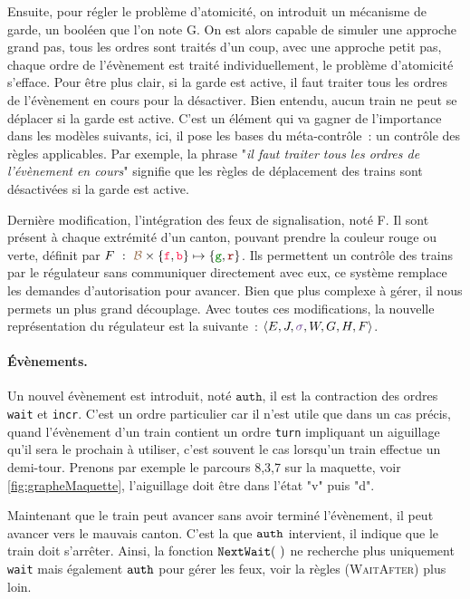 \documentclass[oneside, a4paper, 11pt]{book}
\newcommand{\ruleFmt}[1]{\textsc{(#1)}}
\newcommand{\ruleDef}[1]{\hypertarget{#1}{\ruleFmt{#1}}}
\newcommand{\forward}{\ensuremath{\mathtt{f}}}
\newcommand{\backward}{\ensuremath{\mathtt{b}}}
\newcommand{\dirFmt}[1]{{\color{dircolor} #1}}
\newcommand{\dirForward}{\ensuremath{\dirFmt{\forward}}}
\newcommand{\dirBackward}{\ensuremath{\dirFmt{\backward}}}
\newcommand{\posFmt}[1]{{\color{poscolor}{#1}}}
\newcommand{\authOrder}{{\mbox{\ensuremath{\mathtt{auth}}}}}
\newcommand{\swFmt}[1]{{\color{swcolor}{#1}}}
\newcommand{\sigred}{{\mbox{${\color{red!50!black}\mathtt{r}}$}}}
\newcommand{\siggreen}{{\mbox{${\color{green!50!black}\mathtt{g}}$}}}
\newcommand{\nextWait}[1]{\ensuremath{{\tt NextWait}(#1)}}
\newcommand{\regM}[7]{\langle #1, #2, #3, #4, #5, #6, #7 \rangle}
\begin{document}
Ensuite, pour régler le problème d'atomicité, on introduit un mécanisme de garde, un booléen que l'on note G. On est alors capable de simuler une approche grand pas, tous les ordres sont traités d'un coup, avec une approche petit pas, chaque ordre de l'évènement est traité individuellement, le problème d'atomicité s'efface.
Pour être plus clair, si la garde est active, il faut traiter tous les ordres de l'évènement en cours pour la désactiver. Bien entendu, aucun train ne peut se déplacer si la garde est active.
C'est un élément qui va gagner de l'importance dans les modèles suivants, ici, il pose les bases du méta-contrôle~: un contrôle des règles applicables. Par exemple, la phrase "\textit{il faut traiter tous les ordres de l'évènement en cours}" signifie que les règles de déplacement des trains sont désactivées si la garde est active.

Dernière modification, l'intégration des feux de signalisation, noté F. Il sont présent à chaque extrémité d'un canton, pouvant prendre la couleur rouge ou verte, définit par $F~:~\posFmt{\mathcal{B}} \times \{\dirForward,\dirBackward\} \mapsto \{\siggreen, \sigred\}$. Ils permettent un contrôle des trains par le régulateur sans communiquer directement avec eux, ce système remplace les demandes d'autorisation pour avancer. Bien que plus complexe à gérer, il nous permets un plus grand découplage.
Avec toutes ces modifications, la nouvelle représentation du régulateur est la suivante~: $\regM{E}{J}{\swFmt{\sigma}}{W}{G}{H}{F}$.


\paragraph{Évènements.}
Un nouvel évènement est introduit, noté \authOrder, il est la contraction des ordres \texttt{wait} et \texttt{incr}. C'est un ordre particulier car il n'est utile que dans un cas précis, quand l'évènement d'un train contient un ordre \texttt{turn} impliquant un aiguillage qu'il sera le prochain à utiliser, c'est souvent le cas lorsqu'un train effectue un demi-tour. Prenons par exemple le parcours 8,3,7 sur la maquette, voir \ref{fig:grapheMaquette}, l'aiguillage doit être dans l'état "v" puis "d".

Maintenant que le train peut avancer sans avoir terminé l'évènement, il peut avancer vers le mauvais canton. C'est la que $\authOrder$ intervient, il indique que le train doit s'arrêter. Ainsi, la fonction \nextWait{~} ne recherche plus uniquement \texttt{wait} mais également $\authOrder$ pour gérer les feux, voir la règles \ruleDef{WaitAfter} plus loin.
\end{document}
